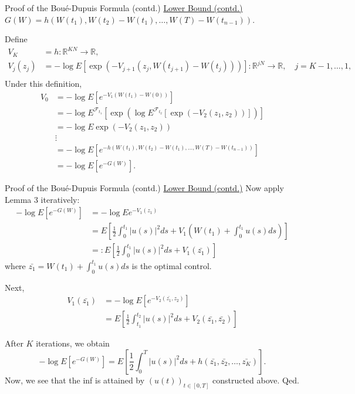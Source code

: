 \documentclass{if-beamer}
\begin{document}
\begin{frame}{Proof of the Boué-Dupuis Formula (contd.)}
    \underline{Lower Bound (contd.)} $G(W) = h(W(t_1), W(t_2) - W(t_1), \dots, W(T) - W(t_{n-1}))$.

    Define
    \begin{align*}
        V_K &= h : \mathbb{R}^{K N} \to \mathbb{R}, \\
        V_j(z_j) &= -\log E\left[ \exp\left( - V_{j+1}(z_j, W(t_{j+1}) - W(t_j)) \right) \right]: \mathbb{R}^{j N} \to \mathbb{R}, \quad j = K-1, \dots, 1,\\
    \end{align*}
    Under this definition,
    \begin{align*}
        V_0 &= -\log E\left[ e^{- V_1(W(t_1) - W(0))} \right] \\
        &= -\log E^{\mathcal{F}_{t_1}}\left[ \exp\left( \log E^{\mathcal{F}_{t_2}}\left[ \exp\left( - V_2(z_1, z_2) \right) \right] \right) \right] \\
        &= - \log E \exp \left( - V_2 (z_1, z_2) \right) \\
        &\vdots \\
        &= -\log E\left[ e^{-h(W(t_1), W(t_2) - W(t_1), \dots, W(T) - W(t_{n-1}))} \right] \\
        &= -\log E\left[e^{-G(W)}\right].
    \end{align*}
\end{frame}

\begin{frame}{Proof of the Boué-Dupuis Formula (contd.)}
    \underline{Lower Bound (contd.)} Now apply Lemma 3 iteratively:
    \begin{align*}
        - \log E\left[e^{-G(W)}\right] &= - \log E e^{- V_1(z_1)} \\
        &= E[ \frac{1}{2} \int_0^{t_1} |u(s)|^2 ds + V_1(W(t_1) + \int_0^{t_1} u(s) ds) ] \\
        &=: E[ \frac{1}{2} \int_0^{t_1} |u(s)|^2 ds + V_1(\bar{z_1})]
    \end{align*}
    where $\bar{z_1} = W(t_1) + \int_0^{t_1} u(s) ds$ is the optimal control.
    
    Next,
    \begin{align*}
        V_1(\bar{z_1}) &= -\log E \left[ e^{- V_2(\bar{z_1}, z_2)} \right] \\
        &= E\left[ \frac{1}{2} \int_{t_1}^{t_2} |u(s)|^2 ds + V_2(\bar{z_1}, \bar{z_2}) \right]
    \end{align*}

    After $K$ iterations, we obtain
    \[
        - \log E\left[e^{-G(W)}\right] = E\left[ \frac{1}{2} \int_0^{T} |u(s)|^2 ds + h(\bar{z_1}, \bar{z_2}, \dots, \bar{z_K}) \right].
    \]
    Now, we see that the inf is attained by $(u(t))_{t \in [0, T]}$ constructed above. Qed.
\end{frame}
\end{document}
